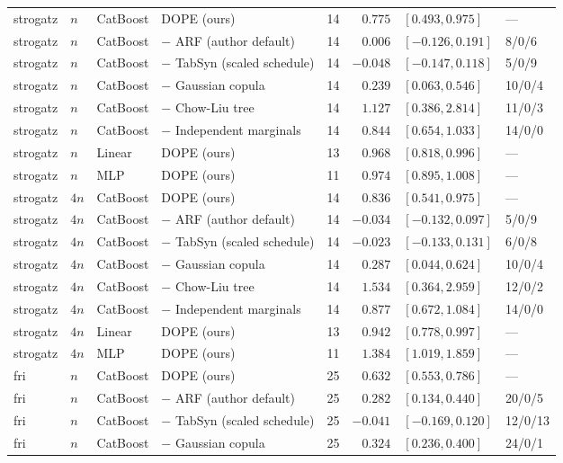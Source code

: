 \begin{longtable}{lllllrll}
strogatz & $n$ & CatBoost & DOPE (ours) & 14 & $0.775$ & $[0.493, 0.975]$ & --- \\
strogatz & $n$ & CatBoost & $-$ ARF (author default) & 14 & $0.006$ & $[-0.126, 0.191]$ & 8/0/6 \\
strogatz & $n$ & CatBoost & $-$ TabSyn (scaled schedule) & 14 & $-0.048$ & $[-0.147, 0.118]$ & 5/0/9 \\
strogatz & $n$ & CatBoost & $-$ Gaussian copula & 14 & $0.239$ & $[0.063, 0.546]$ & 10/0/4 \\
strogatz & $n$ & CatBoost & $-$ Chow-Liu tree & 14 & $1.127$ & $[0.386, 2.814]$ & 11/0/3 \\
strogatz & $n$ & CatBoost & $-$ Independent marginals & 14 & $0.844$ & $[0.654, 1.033]$ & 14/0/0 \\
strogatz & $n$ & Linear & DOPE (ours) & 13 & $0.968$ & $[0.818, 0.996]$ & --- \\
strogatz & $n$ & MLP & DOPE (ours) & 11 & $0.974$ & $[0.895, 1.008]$ & --- \\
strogatz & $4n$ & CatBoost & DOPE (ours) & 14 & $0.836$ & $[0.541, 0.975]$ & --- \\
strogatz & $4n$ & CatBoost & $-$ ARF (author default) & 14 & $-0.034$ & $[-0.132, 0.097]$ & 5/0/9 \\
strogatz & $4n$ & CatBoost & $-$ TabSyn (scaled schedule) & 14 & $-0.023$ & $[-0.133, 0.131]$ & 6/0/8 \\
strogatz & $4n$ & CatBoost & $-$ Gaussian copula & 14 & $0.287$ & $[0.044, 0.624]$ & 10/0/4 \\
strogatz & $4n$ & CatBoost & $-$ Chow-Liu tree & 14 & $1.534$ & $[0.364, 2.959]$ & 12/0/2 \\
strogatz & $4n$ & CatBoost & $-$ Independent marginals & 14 & $0.877$ & $[0.672, 1.084]$ & 14/0/0 \\
strogatz & $4n$ & Linear & DOPE (ours) & 13 & $0.942$ & $[0.778, 0.997]$ & --- \\
strogatz & $4n$ & MLP & DOPE (ours) & 11 & $1.384$ & $[1.019, 1.859]$ & --- \\
fri & $n$ & CatBoost & DOPE (ours) & 25 & $0.632$ & $[0.553, 0.786]$ & --- \\
fri & $n$ & CatBoost & $-$ ARF (author default) & 25 & $0.282$ & $[0.134, 0.440]$ & 20/0/5 \\
fri & $n$ & CatBoost & $-$ TabSyn (scaled schedule) & 25 & $-0.041$ & $[-0.169, 0.120]$ & 12/0/13 \\
fri & $n$ & CatBoost & $-$ Gaussian copula & 25 & $0.324$ & $[0.236, 0.400]$ & 24/0/1 \\

\end{longtable}
